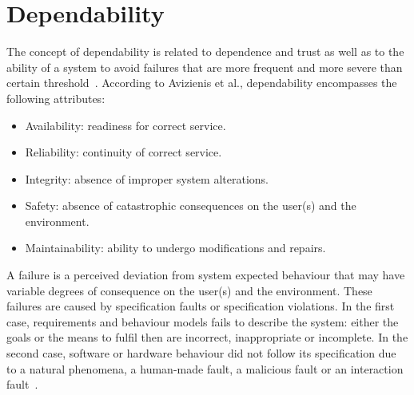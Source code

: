 
\section{Dependability}

The concept of dependability is related to dependence and trust as well as to the ability of a system to avoid failures that are more frequent and more severe than certain threshold~\cite{Laprie2004}. According to Avizienis et al., dependability encompasses the following attributes: 

\begin{itemize}

\item Availability: readiness for correct service.
\medskip

\item Reliability: continuity of correct service.
\medskip

\item Integrity: absence of improper system alterations.
\medskip

\item Safety: absence of catastrophic consequences on the user(s) and the environment.
\medskip

\item Maintainability: ability to undergo modifications and repairs.
\medskip

\end{itemize}



A failure is a perceived deviation from system expected behaviour that may have variable degrees of consequence on the user(s) and the environment. These failures are caused by specification faults or specification violations. In the first case, requirements and behaviour models fails to describe the system: either the goals or the means to fulfil then are incorrect, inappropriate or incomplete. In the second case, software or hardware behaviour did not follow its specification due to a natural phenomena, a human-made fault, a malicious fault or an interaction fault~\cite{Laprie2004}.

